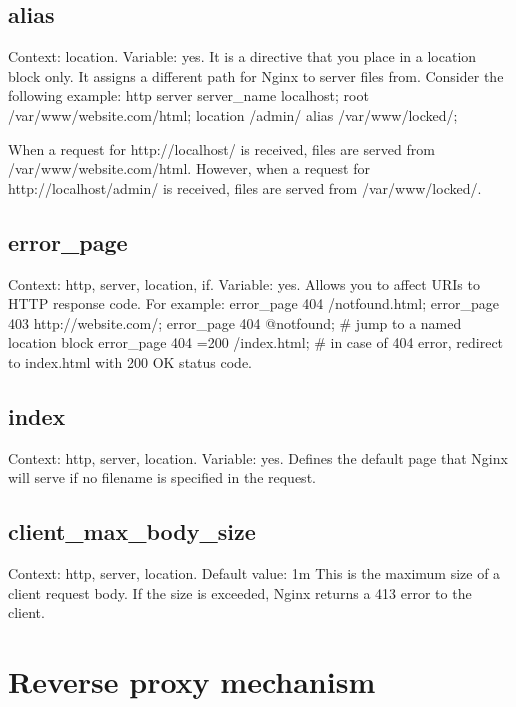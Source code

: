 \documentclass[12pt]{article}
\begin{document}
\subsection{alias}
Context: location. Variable: yes.
It is a directive that you place in a location block only. It assigns a different
path for Nginx to server files from. Consider the following example:
 http {
   server {
       server_name localhost;
       root /var/www/website.com/html;
        location /admin/ {
        alias /var/www/locked/;
      }
   }
 }

 When a request for http://localhost/ is received, files are served from
 /var/www/website.com/html. However, when a request for http://localhost/admin/
 is received, files are served from /var/www/locked/.

\subsection{error_page}
Context: http, server, location, if. Variable: yes.
Allows you to affect URIs to HTTP response code. For example:
error_page 404 /notfound.html;
error_page 403 http://website.com/;
error_page 404 @notfound; # jump to a named location block
error_page 404 =200 /index.html; # in case of 404 error, redirect to
index.html with 200 OK status code.

\subsection{index}
Context: http, server, location. Variable: yes.
Defines the default page that Nginx will serve if no filename is specified in
the request.

\subsection{client_max_body_size}
Context: http, server, location.
Default value: 1m
This is the maximum size of a client request body. If the size is exceeded,
Nginx returns a 413 error to the client.

\section{Reverse proxy mechanism}
\end{document}
